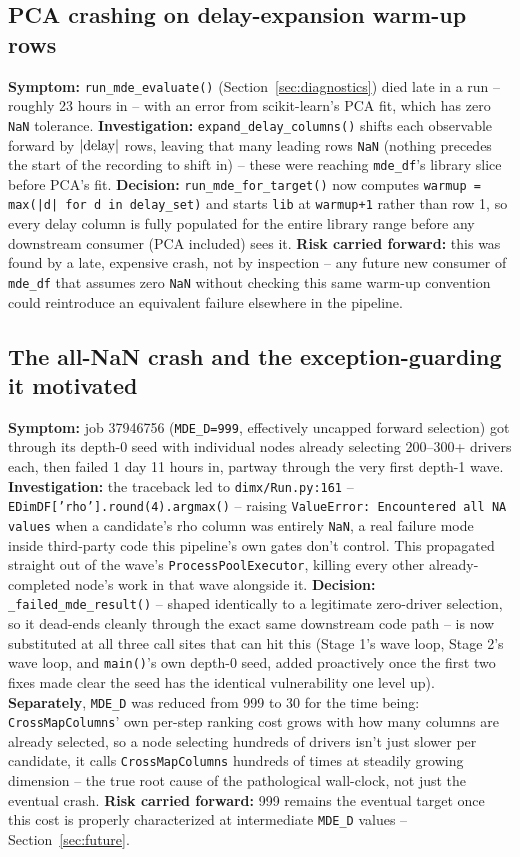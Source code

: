 \documentclass[11pt]{article}
\begin{document}
\subsection{PCA crashing on delay-expansion warm-up rows}
\textbf{Symptom:} \texttt{run\_mde\_evaluate()} (Section~\ref{sec:diagnostics}) died late in a run -- roughly 23 hours in -- with an error from scikit-learn's PCA fit, which has zero \texttt{NaN} tolerance. \textbf{Investigation:} \texttt{expand\_delay\_columns()} shifts each observable forward by $|{\rm delay}|$ rows, leaving that many leading rows \texttt{NaN} (nothing precedes the start of the recording to shift in) -- these were reaching \texttt{mde\_df}'s library slice before PCA's fit. \textbf{Decision:} \texttt{run\_mde\_for\_target()} now computes \texttt{warmup = max(|d| for d in delay\_set)} and starts \texttt{lib} at \texttt{warmup+1} rather than row 1, so every delay column is fully populated for the entire library range before any downstream consumer (PCA included) sees it. \textbf{Risk carried forward:} this was found by a late, expensive crash, not by inspection -- any future new consumer of \texttt{mde\_df} that assumes zero \texttt{NaN} without checking this same warm-up convention could reintroduce an equivalent failure elsewhere in the pipeline.

\subsection{The all-NaN crash and the exception-guarding it motivated}
\label{sec:history-crash}
\textbf{Symptom:} job 37946756 (\texttt{MDE\_D=999}, effectively uncapped forward selection) got through its depth-0 seed with individual nodes already selecting 200--300+ drivers each, then failed 1 day 11 hours in, partway through the very first depth-1 wave. \textbf{Investigation:} the traceback led to \texttt{dimx/Run.py:161} -- \texttt{EDimDF['rho'].round(4).argmax()} -- raising \texttt{ValueError: Encountered all NA values} when a candidate's rho column was entirely \texttt{NaN}, a real failure mode inside third-party code this pipeline's own gates don't control. This propagated straight out of the wave's \texttt{ProcessPoolExecutor}, killing every other already-completed node's work in that wave alongside it. \textbf{Decision:} \texttt{\_failed\_mde\_result()} -- shaped identically to a legitimate zero-driver selection, so it dead-ends cleanly through the exact same downstream code path -- is now substituted at all three call sites that can hit this (Stage 1's wave loop, Stage 2's wave loop, and \texttt{main()}'s own depth-0 seed, added proactively once the first two fixes made clear the seed has the identical vulnerability one level up). \textbf{Separately}, \texttt{MDE\_D} was reduced from 999 to 30 for the time being: \texttt{CrossMapColumns}' own per-step ranking cost grows with how many columns are already selected, so a node selecting hundreds of drivers isn't just slower per candidate, it calls \texttt{CrossMapColumns} hundreds of times at steadily growing dimension -- the true root cause of the pathological wall-clock, not just the eventual crash. \textbf{Risk carried forward:} 999 remains the eventual target once this cost is properly characterized at intermediate \texttt{MDE\_D} values -- Section~\ref{sec:future}.
\end{document}
